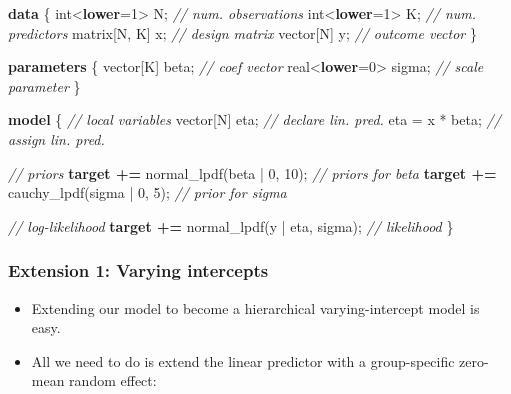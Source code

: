 \documentclass[
  11pt,
]{article}
\newenvironment{Shaded}{\begin{snugshade}}{\end{snugshade}}
\newcommand{\CommentTok}[1]{\textcolor[rgb]{0.56,0.35,0.01}{\textit{#1}}}
\newcommand{\DataTypeTok}[1]{\textcolor[rgb]{0.13,0.29,0.53}{#1}}
\newcommand{\DecValTok}[1]{\textcolor[rgb]{0.00,0.00,0.81}{#1}}
\newcommand{\KeywordTok}[1]{\textcolor[rgb]{0.13,0.29,0.53}{\textbf{#1}}}
\newcommand{\NormalTok}[1]{#1}
\providecommand{\tightlist}{%
  \setlength{\itemsep}{0pt}\setlength{\parskip}{0pt}}
\begin{document}
\begin{Shaded}
\begin{Highlighting}[]
\KeywordTok{data}\NormalTok{ \{}
  \DataTypeTok{int}\NormalTok{\textless{}}\KeywordTok{lower}\NormalTok{=}\DecValTok{1}\NormalTok{\textgreater{} N; }\CommentTok{// num. observations}
  \DataTypeTok{int}\NormalTok{\textless{}}\KeywordTok{lower}\NormalTok{=}\DecValTok{1}\NormalTok{\textgreater{} K; }\CommentTok{// num. predictors}
  \DataTypeTok{matrix}\NormalTok{[N, K] x; }\CommentTok{// design matrix}
  \DataTypeTok{vector}\NormalTok{[N] y;    }\CommentTok{// outcome vector}
\NormalTok{\}}

\KeywordTok{parameters}\NormalTok{ \{}
  \DataTypeTok{vector}\NormalTok{[K] beta;      }\CommentTok{// coef vector}
  \DataTypeTok{real}\NormalTok{\textless{}}\KeywordTok{lower}\NormalTok{=}\DecValTok{0}\NormalTok{\textgreater{} sigma; }\CommentTok{// scale parameter}
\NormalTok{\}}

\KeywordTok{model}\NormalTok{ \{}
  \CommentTok{// local variables}
  \DataTypeTok{vector}\NormalTok{[N] eta;  }\CommentTok{// declare lin. pred.}
\NormalTok{  eta = x * beta; }\CommentTok{// assign lin. pred.}

  \CommentTok{// priors}
  \KeywordTok{target +=}\NormalTok{ normal\_lpdf(beta | }\DecValTok{0}\NormalTok{, }\DecValTok{10}\NormalTok{);  }\CommentTok{// priors for beta}
  \KeywordTok{target +=}\NormalTok{ cauchy\_lpdf(sigma | }\DecValTok{0}\NormalTok{, }\DecValTok{5}\NormalTok{);  }\CommentTok{// prior for sigma}
  
  \CommentTok{// log{-}likelihood}
  \KeywordTok{target +=}\NormalTok{ normal\_lpdf(y | eta, sigma); }\CommentTok{// likelihood}
\NormalTok{\}}
\end{Highlighting}
\end{Shaded}

\hypertarget{extension-1-varying-intercepts}{%
\subsubsection{Extension 1: Varying intercepts}\label{extension-1-varying-intercepts}}

\begin{itemize}
\tightlist
\item
  Extending our model to become a hierarchical varying-intercept model is easy.
\item
  All we need to do is extend the linear predictor with a group-specific zero-mean random effect:
\end{itemize}
\end{document}
